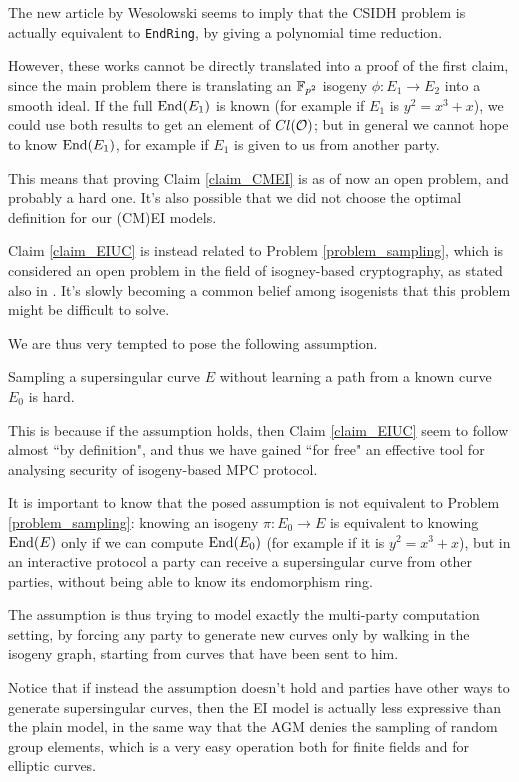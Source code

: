 The new article by Wesolowski \cite{Weso_CSIDH} seems to imply that the CSIDH problem is actually equivalent to \texttt{EndRing}, by giving a polynomial time reduction.

However, these works cannot be directly translated into a proof of the first claim, since the main problem there is translating an $\mathbb{F}_{p^2}$ isogeny $\phi: E_1\to E_2$ into a smooth ideal. If the full $\operatorname{End}(E_1)$ is known (for example if $E_1$ is $y^2=x^3+x$), we could use both results to get an element of $Cl(\mathcal{O})$; but in general we cannot hope to know $\operatorname{End}(E_1)$, for example if $E_1$ is given to us from another party.

This means that proving Claim \ref{claim_CMEI} is as of now an open problem, and probably a hard one. It's also possible that we did not choose the optimal definition for our (CM)EI models.

Claim \ref{claim_EIUC} is instead related to Problem \ref{problem_sampling}, which is considered an open problem in the field of isogney-based cryptography, as stated also in \cite{CSIDH_EndRing}. It's slowly becoming a common belief among isogenists that this problem might be difficult to solve.

We are thus very tempted to pose the following assumption.

\begin{assumption}
    Sampling a supersingular curve $E$ without learning a path from a known curve $E_0$ is hard.
\end{assumption}

This is because if the assumption holds, then Claim \ref{claim_EIUC} seem to follow almost ``by definition", and thus we have gained ``for free" an effective tool for analysing security of isogeny-based MPC protocol.

It is important to know that the posed assumption is not equivalent to Problem \ref{problem_sampling}: knowing an isogeny $\pi: E_0\to E$ is equivalent to knowing $\operatorname{End}(E)$ only if we can compute $\operatorname{End}(E_0)$ (for example if it is $y^2=x^3+x$), but in an interactive protocol a party can receive a supersingular curve from other parties, without being able to know its endomorphism ring.

The assumption is thus trying to model exactly the multi-party computation setting, by forcing any party to generate new curves only by walking in the isogeny graph, starting from curves that have been sent to him.

Notice that if instead the assumption doesn't hold and parties have other ways to generate supersingular curves, then the EI model is actually less expressive than the plain model, in the same way that the AGM denies the sampling of random group elements, which is a very easy operation both for finite fields and for elliptic curves.

